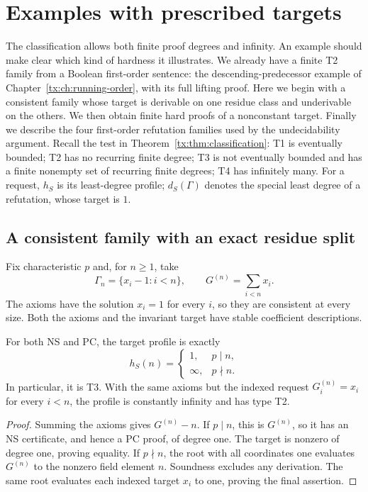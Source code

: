 \chapter{Examples with prescribed targets}\label{tx:ch:examples}
The classification allows both finite proof degrees and infinity. An
example should make clear which kind of hardness it illustrates. We
already have a finite T2 family from a Boolean first-order sentence:
the descending-predecessor example of
Chapter~\ref{tx:ch:running-order}, with its full lifting proof. Here we
begin with a consistent family whose target is derivable on one residue
class and underivable on the others. We then obtain finite hard proofs
of a nonconstant target. Finally we describe the four first-order
refutation families used by the undecidability argument.
Recall the test in Theorem~\ref{tx:thm:classification}: T1 is eventually
bounded; T2 has no recurring finite degree; T3 is not eventually bounded and has a finite
nonempty set of recurring finite degrees; T4 has infinitely many. For a request,
$h_S$ is its least-degree profile; $d_S(\Gamma)$ denotes the special
least degree of a refutation, whose target is $1$.

\section{A consistent family with an exact residue split}
Fix characteristic $p$ and, for $n\ge1$, take
\[
                  \Gamma_n=\{x_i-1:i<n\},\qquad
                  G^{(n)}=\sum_{i<n}x_i.
\]
The axioms have the solution $x_i=1$ for every $i$, so they are
consistent at every size. Both the axioms and the invariant target
have stable coefficient descriptions.

\begin{proposition}\label{tx:prop:consistent-T3}
For both NS and PC, the target profile is exactly
\[
 h_S(n)=\begin{cases}1,&p\mid n,\\\infty,&p\nmid n.\end{cases}
\]
In particular, it is T3. With the same axioms but the indexed request
$G_i^{(n)}=x_i$ for every $i<n$, the profile is constantly infinity and
has type T2.
\end{proposition}
\begin{proof}
Summing the axioms gives $G^{(n)}-n$. If $p\mid n$, this is $G^{(n)}$, so it
has an NS certificate, and hence a PC proof, of degree one. The target
is nonzero of degree one, proving equality. If $p\nmid n$, the root
with all coordinates one evaluates $G^{(n)}$ to the nonzero field element
$n$. Soundness excludes any derivation. The same root evaluates each
indexed target $x_i$ to one, proving the final assertion.
\end{proof}

